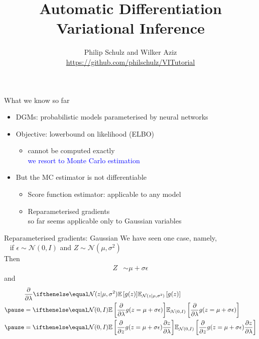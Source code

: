\documentclass[14pt,dvipsnames]{beamer}
\title{Automatic Differentiation Variational Inference}
\author{Philip Schulz and Wilker Aziz\\
\url{https://github.com/philschulz/VITutorial}}
\date{}
\begin{document}
\begin{frame}
\maketitle
\end{frame}

\begin{frame}{What we know so far}
    \begin{itemize}
        \item DGMs: \pause probabilistic models parameterised by neural networks \pause
        \item Objective: \pause lowerbound on likelihood (ELBO) \pause
        \begin{itemize}
        		\item \alert{cannot be computed exactly} \\ \pause
        		\textcolor{blue}{we resort to Monte Carlo estimation} \pause		
	\end{itemize}
	\item \alert{But the MC estimator is not differentiable} \pause		        
	\begin{itemize}
       		\item Score function estimator: applicable to any model  \pause
		\item Reparameterised gradients\\
		so far seems applicable only to Gaussian variables
        \end{itemize}
    \end{itemize}
    
\end{frame}

\begin{frame}{Reparameterised gradients: Gaussian}
	We have  seen one case, namely,\\
	~ if $\epsilon \sim \mathcal N(0, I)$ and $Z \sim \mathcal N(\mu,\sigma^2)$\pause\\
	Then
	\begin{equation*}
	\begin{aligned}
		Z &\sim \mu +  \sigma  \epsilon
	\end{aligned}
	\end{equation*}
	and
	\begin{equation*}
	\begin{aligned}
		&\pdv{\lambda} \E[\mathcal N(z|\mu, \sigma^2)]{ g(z) }\\ \pause
		&= \E[\mathcal N(0, I)]{\pdv{\lambda} g(z = \mu + \sigma  \epsilon)} \\ \pause
		&= \E[\mathcal N(0, I)]{\pdv{z} g(z = \mu + \sigma  \epsilon) \pdv{z}{\lambda}}
	\end{aligned}
	\end{equation*}
\end{frame}
\end{document}
